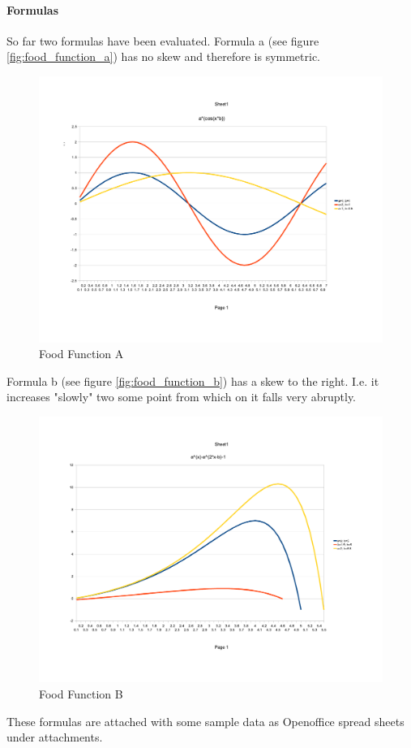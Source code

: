\paragraph{Formulas}
So far two formulas have been evaluated.
Formula a (see figure \vref{fig:food_function_a}) has no skew and therefore is
symmetric. \begin{figure}[htb]
\centering
\includegraphics[width=\textwidth]{images/food_function_a}
\caption{Food Function A}
\label{fig:food_function_a}
\end{figure}
Formula b (see figure \vref{fig:food_function_b}) has a skew to the right. I.e.
it increases "slowly" two some point from which on it falls very abruptly. 
\begin{figure}[htb]
\centering
\includegraphics[width=\textwidth]{images/food_function_b}
\caption{Food Function B}
\label{fig:food_function_b}
\end{figure}
These formulas are attached with some sample data as Openoffice spread sheets under attachments.

